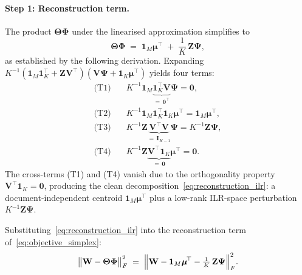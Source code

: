\documentclass{article}
\begin{document}
\paragraph{Step 1: Reconstruction term.}
The product $\boldsymbol{\Theta}\boldsymbol{\Phi}$ under the linearised
approximation simplifies to
\begin{equation}
  \boldsymbol{\Theta}\boldsymbol{\Phi}
  \;=\;
  \mathbf{1}_M\boldsymbol{\mu}^{\!\top}
  \;+\;
  \frac{1}{K}\,\mathbf{Z}\boldsymbol{\Psi},
  \label{eq:reconstruction_ilr}
\end{equation}
as established by the following derivation. Expanding
$K^{-1}(\mathbf{1}_M\mathbf{1}_K^{\!\top}
+ \mathbf{Z}\mathbf{V}^{\!\top})(\mathbf{V}\boldsymbol{\Psi}
+ \mathbf{1}_K\boldsymbol{\mu}^{\!\top})$ yields four terms:
\begin{align*}
  \text{(T1)}\quad
  &K^{-1}\mathbf{1}_M
   \underbrace{\mathbf{1}_K^{\!\top}\mathbf{V}}_{=\,\mathbf{0}^{\!\top}}
   \boldsymbol{\Psi}
   = \mathbf{0}, \\
  \text{(T2)}\quad
  &K^{-1}\mathbf{1}_M\mathbf{1}_K^{\!\top}\mathbf{1}_K
   \boldsymbol{\mu}^{\!\top}
   = \mathbf{1}_M\boldsymbol{\mu}^{\!\top}, \\
  \text{(T3)}\quad
  &K^{-1}\mathbf{Z}
   \underbrace{\mathbf{V}^{\!\top}\mathbf{V}}_{=\,\mathbf{I}_{K-1}}
   \boldsymbol{\Psi}
   = K^{-1}\mathbf{Z}\boldsymbol{\Psi}, \\
  \text{(T4)}\quad
  &K^{-1}\mathbf{Z}
   \underbrace{\mathbf{V}^{\!\top}\mathbf{1}_K}_{=\,\mathbf{0}}
   \boldsymbol{\mu}^{\!\top}
   = \mathbf{0}.
\end{align*}
The cross-terms (T1) and (T4) vanish due to the orthogonality property
$\mathbf{V}^{\!\top}\mathbf{1}_K=\mathbf{0}$, producing the clean
decomposition~\eqref{eq:reconstruction_ilr}: a document-independent
centroid $\mathbf{1}_M\boldsymbol{\mu}^{\!\top}$ plus a low-rank
ILR-space perturbation $K^{-1}\mathbf{Z}\boldsymbol{\Psi}$.

Substituting~\eqref{eq:reconstruction_ilr} into the reconstruction
term of~\eqref{eq:objective_simplex}:
\begin{equation}
  \bigl\|\mathbf{W}
    - \boldsymbol{\Theta}\boldsymbol{\Phi}\bigr\|_F^2
  \;=\;
  \Bigl\|\mathbf{W}
    - \mathbf{1}_M\boldsymbol{\mu}^{\!\top}
    - \tfrac{1}{K}\,\mathbf{Z}\boldsymbol{\Psi}
  \Bigr\|_F^2.
  \label{eq:recon_ilr}
\end{equation}
\end{document}
